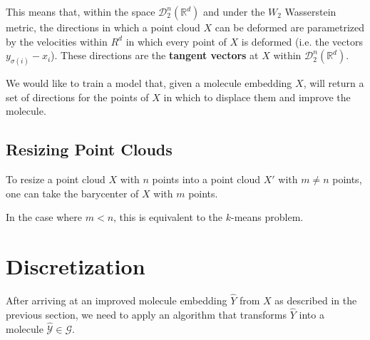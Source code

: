 \documentclass{article}
\begin{document}
This means that, within the space $\mathscr{D}^n_2({\mathbb{R}^d})$ and under the $W_2$ Wasserstein metric, the directions in which a point cloud $X$ can be deformed are parametrized by the velocities within $R^d$ in which every point of $X$ is deformed (i.e. the vectors $y_{\sigma(i)} - x_i$). These directions are the \textbf{tangent vectors} at $X$ within $\mathscr{D}^n_2({\mathbb{R}^d})$.

We would like to train a model that, given a molecule embedding $X$, will return a set of directions for the points of $X$ in which to displace them and improve the molecule.

\subsection{Resizing Point Clouds}
To resize a point cloud $X$ with $n$ points into a point cloud $X'$ with $m\neq n$ points, one can take the barycenter of $X$ with $m$ points. 

In the case where $m < n$, this is equivalent to the $k$-means problem.

\section{Discretization}

After arriving at an improved molecule embedding $\hat{Y}$ from $X$ as described in the previous section, we need to apply an algorithm that transforms $\hat{Y}$ into a molecule $\hat{\mathcal{Y}}\in\mathcal{G}$.
\end{document}
